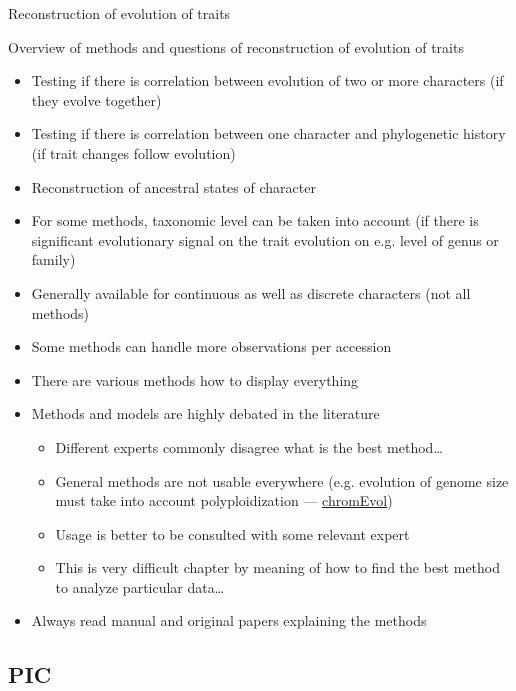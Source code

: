 \documentclass[compress, xelatex, 11pt, xcolor=svgnames, aspectratio=169,
	hyperref={
		bookmarks=true,
		unicode=true,
		colorlinks=true,
		pdftitle={Molecular data in R},
		plainpages=false,
		pdfauthor={Vojtech Zeisek},
		pdfsubject={Course about phylogeny and evolution in R},
		pdfcreator={XeLaTeX},
		pdfkeywords={R, evolution, phylogeny, molecular data},
		linkcolor=Crimson, %
		anchorcolor=Magenta, %
		citecolor=Magenta, %
		filecolor=Magenta, %
		menucolor=Magenta, %
		urlcolor=DodgerBlue, %
		},
	url={hyphens, lowtilde} %
	]{beamer}
\begin{document}
\begin{frame}{Reconstruction of evolution of traits}
	\tableofcontents[currentsection, sectionstyle=show/hide, hideothersubsections]
\end{frame}

\begin{frame}[allowframebreaks]{Overview of methods and questions of reconstruction of evolution of traits}
	\begin{itemize}
		\item Testing if there is correlation between evolution of two or more characters (if they evolve together)
		\item Testing if there is correlation between one character and phylogenetic history (if trait changes follow evolution)
		\item Reconstruction of ancestral states of character
		\item For some methods, taxonomic level can be taken into account (if there is significant evolutionary signal on the trait evolution on e.g. level of genus or family)
		\item Generally available for continuous as well as discrete characters (not all methods)
		\item Some methods can handle more observations per accession
		\item There are various methods how to display everything
		\item Methods and models are highly debated in the literature
		\begin{itemize}
			\item Different experts commonly disagree what is the best method\ldots
			\item General methods are not usable everywhere (e.g. evolution of genome size must take into account polyploidization --- \href{https://github.com/soungalo/chromEvol}{chromEvol})
			\item Usage is better to be consulted with some relevant expert
			\item This is very difficult chapter by meaning of how to find the best method to analyze particular data\ldots
		\end{itemize}
		\item Always read manual and original papers explaining the methods
	\end{itemize}
\end{frame}

\subsection{PIC}
\end{document}
